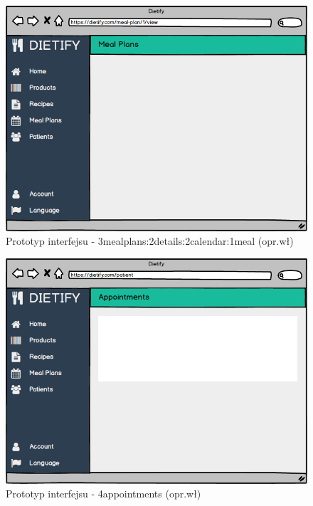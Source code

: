 \begin{minipage}{\textwidth}
    \begin{figure}[H]
        \centering\includegraphics[scale=0.55]{../mockup/3mealplans_2details_2calendar_1meal.png}
        \caption{Prototyp interfejsu - 3mealplans:2details:2calendar:1meal (opr.wł)}\label{rysunek:3mealplans_2details_2calendar_1meal}
    \end{figure}
\end{minipage}
\begin{minipage}{\textwidth}
    \begin{figure}[H]
        \centering\includegraphics[scale=0.55]{../mockup/4appointments.png}
        \caption{Prototyp interfejsu - 4appointments (opr.wł)}\label{rysunek:4appointments}
    \end{figure}
\end{minipage}
